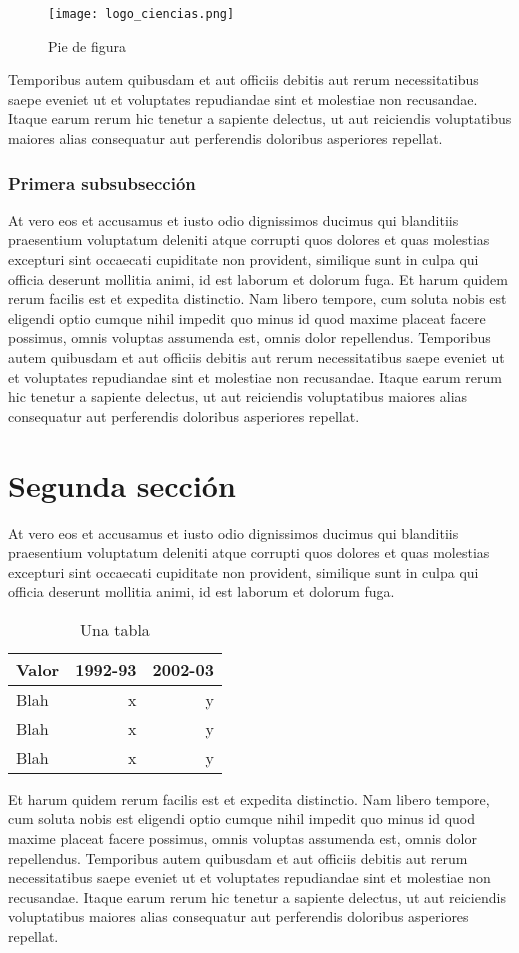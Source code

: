 \begin{figure}[H]
  \centering
  \texttt{[image: logo\_ciencias.png]}
  \caption{Pie de figura}
  \label{fig:ejemplo1}
\end{figure}

Temporibus autem quibusdam et aut
officiis debitis aut rerum necessitatibus saepe eveniet ut et voluptates
repudiandae sint et molestiae non recusandae. Itaque earum rerum hic
tenetur a sapiente delectus, ut aut reiciendis voluptatibus maiores
alias consequatur aut perferendis doloribus asperiores repellat.

\subsubsection{Primera subsubsección}
At vero eos et accusamus et iusto odio dignissimos ducimus
qui blanditiis praesentium voluptatum deleniti atque corrupti
quos dolores et quas molestias excepturi sint occaecati cupiditate
non provident, similique sunt in culpa qui officia deserunt mollitia animi,
id est laborum et dolorum fuga. Et harum quidem rerum facilis est et expedita
distinctio. Nam libero tempore, cum soluta nobis est eligendi optio cumque
nihil impedit quo minus id quod maxime placeat facere possimus, omnis voluptas
assumenda est, omnis dolor repellendus. Temporibus autem quibusdam et aut
officiis debitis aut rerum necessitatibus saepe eveniet ut et voluptates
repudiandae sint et molestiae non recusandae. Itaque earum rerum hic
tenetur a sapiente delectus, ut aut reiciendis voluptatibus maiores
alias consequatur aut perferendis doloribus asperiores repellat.

\section{Segunda sección}
At vero eos et accusamus et iusto odio dignissimos ducimus
qui blanditiis praesentium voluptatum deleniti atque corrupti
quos dolores et quas molestias excepturi sint occaecati cupiditate
non provident, similique sunt in culpa qui officia deserunt mollitia animi,
id est laborum et dolorum fuga.

\begin{table}[H]
\centering
    \begin{tabular}{lrr}
      \hline
      Valor & 1992-93 & 2002-03 \\
      \hline
      Blah & x & y \\
      Blah & x & y \\
      Blah & x & y \\
      \hline
    \end{tabular}
  \caption{Una tabla}
\end{table}

Et harum quidem rerum facilis est et expedita
distinctio. Nam libero tempore, cum soluta nobis est eligendi optio cumque
nihil impedit quo minus id quod maxime placeat facere possimus, omnis voluptas
assumenda est, omnis dolor repellendus. Temporibus autem quibusdam et aut
officiis debitis aut rerum necessitatibus saepe eveniet ut et voluptates
repudiandae sint et molestiae non recusandae. Itaque earum rerum hic
tenetur a sapiente delectus, ut aut reiciendis voluptatibus maiores
alias consequatur aut perferendis doloribus asperiores repellat.
